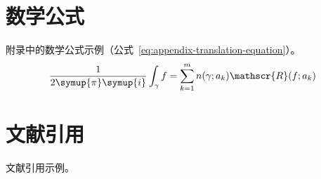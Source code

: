 \begin{translation}
\section{数学公式}

附录中的数学公式示例（公式~\eqref{eq:appendix-translation-equation}）。
\begin{equation}
  \frac{1}{2 \symup{\pi} \symup{i}} \int_\gamma f = \sum_{k=1}^m n(\gamma; a_k) \mathscr{R}(f; a_k)
  \label{eq:appendix-translation-equation}
\end{equation}


\section{文献引用}

文献引用示例\cite{abrahams99tex}。





\begin{translation-index}
  \nocite{salomon1995advanced}
  
  
\end{translation-index}

\end{translation}
